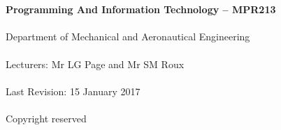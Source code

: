\begin{titlepage}
    \thispagestyle{empty}
    \\~\\[18cm]
    \large
    \textbf{Programming And Information Technology -- MPR213} \\~\\
    Department of Mechanical and Aeronautical Engineering \\~\\[0.5cm]
    \normalsize
    Lecturers: Mr LG Page and  Mr SM Roux \\~\\
    Last Revision: 15 January 2017 \\~\\[0.5em]
    \textcopyright \quad Copyright reserved \\~\\
\end{titlepage}
\restoregeometry

